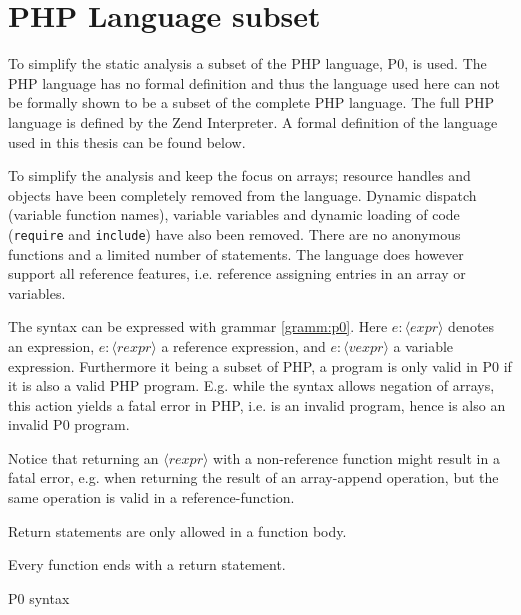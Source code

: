 \section{PHP Language subset}
\newcommand{\syn}[1]{\langle#1\rangle}
\label{sec:langsubset}
To simplify the static analysis a subset of the PHP language, P0, is used. The PHP language has no formal definition and thus the language used here can not be formally shown to be a subset of the complete PHP language. The full PHP language is defined by the Zend Interpreter. A formal definition of the language used in this thesis can be found below.

To simplify the analysis and keep the focus on arrays; resource handles and objects have been completely removed from the language. Dynamic dispatch (variable function names), variable variables and dynamic loading of code (\texttt{require} and \texttt{include}) have also been removed. There are no anonymous functions and a limited number of statements. The language does however support all reference features, i.e. reference assigning entries in an array or variables.

The syntax can be expressed with grammar \ref{gramm:p0}. Here $e : \syn{expr}$ denotes an expression, $e : \syn{rexpr}$ a reference expression, and $e : \syn{vexpr}$ a variable expression.   Furthermore it being a subset of PHP, a program is only valid in P0  if it is also a valid PHP program. E.g. while the syntax allows negation of arrays, this action yields a fatal error in PHP, i.e. is an invalid program, hence is also an invalid P0 program. 

Notice that returning an $\syn{rexpr}$ with a non-reference function might result in a fatal error, e.g. when returning the result of an array-append operation, but the same operation is valid in a reference-function.  

Return statements are only allowed in a function body.

Every function ends with a return statement.




\begin{grammarf}
\centering

\caption{P0 syntax }
\label{gramm:p0}
\end{grammarf}